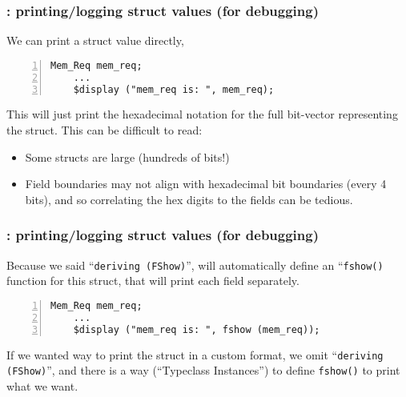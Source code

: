 \begin{frame}[fragile]
\frametitle{{\BSV}: printing/logging struct values (for debugging)}

\footnotesize

We can print a struct value directly, {\eg}

{\footnotesize
\begin{Verbatim}[frame=single, numbers=left]
    Mem_Req mem_req;
    ...
    $display ("mem_req is: ", mem_req);
\end{Verbatim}
}

\vspace{5ex}

This will just print the hexadecimal notation for the full bit-vector
representing the struct.  This can be difficult to read:

\begin{itemize}
 \item Some structs are large (hundreds of bits!)

 \item Field boundaries may not align with hexadecimal bit boundaries
       (every 4 bits), and so correlating the hex digits to the fields
       can be tedious.
\end{itemize}

\end{frame}


\begin{frame}[fragile]
\frametitle{{\BSV}: printing/logging struct values (for debugging)}

\footnotesize

Because we said ``{\tt deriving (FShow)}'', {\bsc} will automatically
define an ``{\tt fshow()} function for this struct, that will print
each field separately.

\vspace{2ex}

{\footnotesize
\begin{Verbatim}[frame=single, numbers=left]
    Mem_Req mem_req;
    ...
    $display ("mem_req is: ", fshow (mem_req));
\end{Verbatim}
}

\PAUSE{\vspace{5ex}}

If we wanted way to print the struct in a custom format, we omit
``{\tt deriving (FShow)}'', and there is a way (``Typeclass
Instances'') to define {\tt fshow()} to print what we want.

\end{frame}


